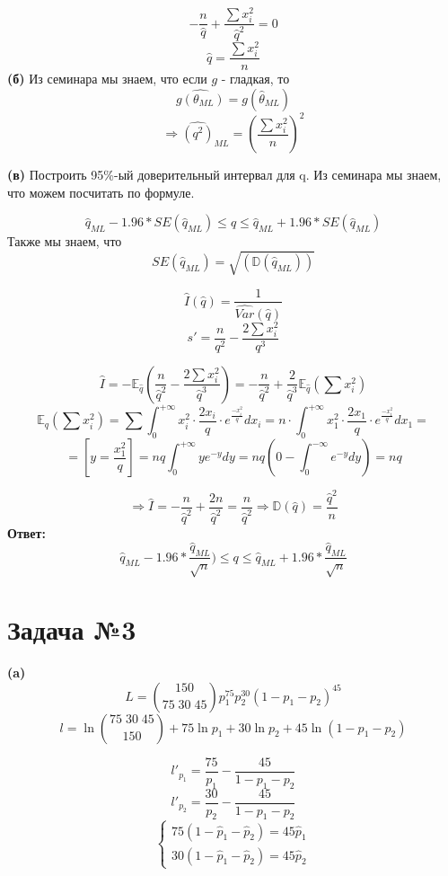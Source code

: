 \documentclass[a4paper, 12pt]{article} %
\begin{document}
\[
    -\frac{n}{\hat q} + \frac{\sum{x^2_i}}{\hat q^2} = 0
\]
\[
\hat q = \frac{\sum{x^2_i}}{n}
\]
\textbf{(б)}
Из семинара мы знаем, что если $g$ - гладкая, то
\[
    \widehat{g(\theta_{ML})} = g(\hat{\theta}_{ML})
\]
\[
\Rightarrow \widehat{(q^2)}_{ML} = \left({\frac{\sum{x^2_i}}{n}}\right)^2
\]

\textbf{(в)} Построить 95\%-ый доверительный интервал для q.
Из семинара мы знаем, что можем посчитать по формуле.

\[
    \hat q_{ML} - 1.96 * SE(\hat q_{ML})\leq q \leq  \hat q_{ML} + 1.96 * SE(\hat q_{ML})
\]
Также мы знаем, что 
\[
    SE(\hat q_{ML}) = \sqrt{(\mathbb D(\hat q_{ML}))}
    \]

\[\hat I (\hat q) = \frac{1}{\widehat {Var}(\hat q)} \]
\[
    s' = \frac{n}{q^2} - \frac{2\sum x^2_i}{q^3}
\]

\[
    \hat I = -\mathbb{E}_{\hat q} \left( \frac{n}{\hat q^2} - \frac{2\sum x^2_i}{\hat q^3}\right) = 
    -\frac{n}{\hat q^2} + \frac{2}{\hat q ^ 3}\mathbb{E}_{\hat q}(\sum{x^2_i}) 
\]
\[
    \mathbb{E}_{q}(\sum{x^2_i}) = \sum \int_0^{+\infty} x_i^2 \cdot \frac{2x_i}{q} \cdot e^{\frac{-x_i^2}{q}}dx_i = 
    n \cdot \int_0^{+\infty} x_1^2 \cdot \frac{2x_1}{q} \cdot e^{\frac{-x_1^2}{q}}dx_1 = 
\]
\[
    =\left[ y = \frac{x_1^2}{q}\right] = 
    nq\int_0^{+\infty}ye^{-y}dy = 
    nq \left(0 - \int_0^{-\infty} e^{-y}dy \right) = nq
    \]

\[
\Rightarrow \hat I = -\frac{n}{\hat q^2} + \frac{2n}{\hat q^2} = \frac{n}{\hat q^2} 
\Rightarrow \mathbb{D}(\hat q) = \frac{\hat q ^ 2}{n}
\]
\textbf{Ответ:}
\[
\hat q_{ML} - 1.96 * \frac{\hat q_{ML}}{\sqrt n})\leq q \leq  \hat q_{ML} + 1.96 * \frac{\hat q_{ML}}{\sqrt n}
\]

\newpage
\section*{Задача №3}
\textbf{(a)}
\[
    L = \binom{150}{75 \;30\; 45} p_1^{75}p_2^{30}(1 - p_1 - p_2)^{45} \]
\[    
    l = \ln\binom{75\; 30\; 45}{150} + 75 \ln p_1 + 30\ln p_2 + 45\ln(1 - p_1 - p_2)
\]

\[
l'_{p_1} = \frac{75}{p_1} - \frac{45}{1- p_1 - p_2}
\]
\[
    l'_{p_2} = \frac{30}{p_2} - \frac{45}{1- p_1 - p_2}
    \]
\[\left\{
    \begin{gathered}
    75(1 - \hat p_1 - \hat p_2) = 45\hat p_1 \\
    30(1 - \hat p_1 - \hat p_2) = 45\hat p_2
\end{gathered} \right.
\]
\end{document}
